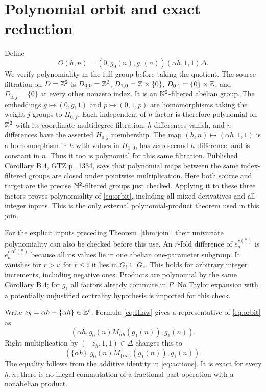 \documentclass[11pt]{article}
\begin{document}
\section{Polynomial orbit and exact reduction}
Define
\begin{equation}\label{eq:orbit}
 O(h,n)=(0,g_0(n),g_1(n))(\alpha h,1,1)\Delta.
\end{equation}
We verify polynomiality in the full group before taking the quotient.
The source filtration on $D=\mathbb Z^2$ is
$D_{0,0}=\mathbb Z^2$, $D_{1,0}=\mathbb Z\times\{0\}$,
$D_{0,1}=\{0\}\times\mathbb Z$, and $D_{a,j}=\{0\}$ at every other
nonzero index. It is an $\mathbb N^2$-filtered abelian group.
The embeddings $g\mapsto(0,g,1)$ and $p\mapsto(0,1,p)$ are
homomorphisms taking the weight-$j$ groups to $H_{0,j}$.
Each independent-of-$h$ factor is therefore polynomial on $\mathbb Z^2$ with
its coordinate multidegree filtration: $h$ differences vanish, and
$n$ differences have the asserted $H_{0,j}$ membership.
The map $(h,n)\mapsto(\alpha h,1,1)$ is a homomorphism in $h$ with
values in $H_{1,0}$, has zero second $h$ difference, and is constant
in $n$. Thus it too is polynomial for this same filtration.
Published Corollary B.4, GTZ p.~1334, says that polynomial maps between
the same index-filtered groups are closed under pointwise multiplication.
Here both source and target are the precise $\mathbb N^2$-filtered groups
just checked. Applying it to these three factors proves polynomiality
of \eqref{eq:orbit}, including all mixed derivatives and all integer inputs.
This is the only external polynomial-product theorem used in this join.

For the explicit inputs preceding Theorem~\ref{thm:join}, their univariate
polynomiality can also be checked before this use. An $r$-fold difference
of $e_a^{c\binom ni}$ is $e_a^{c\Delta^r\binom ni}$ because all its
values lie in one abelian one-parameter subgroup. It vanishes for $r>i$;
for $r\leq i$ it lies in $G_i\subseteq G_r$. This holds for arbitrary
integer increments, including negative ones. Products are polynomial by
the same Corollary B.4; for $g_1$ all factors already commute in $P$.
No Taylor expansion with a potentially unjustified centrality hypothesis
is imported for this check.

Write $z_h=\alpha h-\{\alpha h\}\in\mathbb Z^\ell$. Formula
\eqref{eq:Hlaw} gives a representative of \eqref{eq:orbit} as
\[
 (\alpha h,g_0(n)M_{\alpha h}(g_1(n)),g_1(n)).
\]
Right multiplication by $(-z_h,1,1)\in\Delta$ changes this to
\begin{equation}\label{eq:reduced}
 (\{\alpha h\},g_0(n)M_{\{\alpha h\}}(g_1(n)),g_1(n)).
\end{equation}
The equality follows from the additive identity in \eqref{eq:actions}.
It is exact for every $h,n$; there is no illegal commutation of a
fractional-part operation with a nonabelian product.
\end{document}
